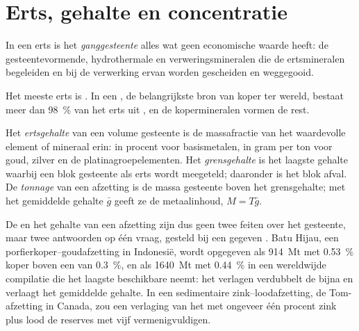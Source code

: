 \section{Erts, gehalte en concentratie}\label{sec:b2:ore-deposits:grade}

\begin{definition}[Ganggesteente]\label{def:b2:ore-deposits:ore}
In een erts is het \emph{ganggesteente} alles wat geen economische waarde heeft: de
gesteentevormende, hydrothermale en verweringsmineralen die de ertsmineralen begeleiden en
bij de verwerking ervan worden gescheiden en weggegooid.
\end{definition}

Het meeste erts is . In een , de belangrijkste bron van koper ter wereld, bestaat meer dan
\qty{98}{\percent} van het erts uit , en de kopermineralen vormen de rest.

\begin{definition}\label{def:b2:ore-deposits:grade}
Het \emph{ertsgehalte} van een volume gesteente is de massafractie van het waardevolle
element of mineraal erin: in procent voor basismetalen, in gram per ton voor goud, zilver en de
platinagroepelementen. Het \emph{grensgehalte} is het laagste gehalte waarbij
een blok gesteente als erts wordt meegeteld; daaronder is het blok afval. De
\emph{tonnage} van een afzetting is de massa gesteente boven het grensgehalte; met het
gemiddelde gehalte $\bar g$ geeft ze de metaalinhoud, $M = T\bar g$.
\end{definition}

De  en het gehalte van een afzetting zijn dus geen twee feiten over het gesteente, maar twee
antwoorden op één vraag, gesteld bij een gegeven . Batu Hijau, een porfierkoper--goudafzetting in
Indonesië, wordt opgegeven als \qty{914}{Mt} met \qty{0.53}{\percent} koper boven een
 van \qty{0.3}{\percent}, en als \qty{1640}{Mt} met \qty{0.44}{\percent} in een wereldwijde compilatie
die het laagste beschikbare  neemt: het  verlagen verdubbelt de  bijna en
verlaagt het gemiddelde gehalte. In een sedimentaire zink--loodafzetting, de Tom-afzetting in Canada, zou een verlaging
van het  met ongeveer één procent zink plus lood de reserves met vijf vermenigvuldigen.

